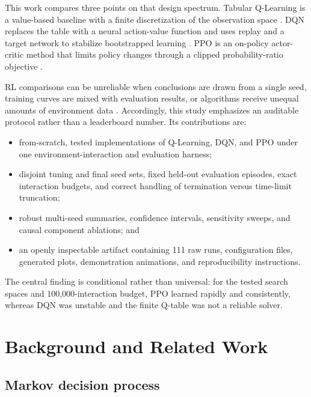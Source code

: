 \documentclass[11pt]{article}
\begin{document}
This work compares three points on that design spectrum. Tabular Q-Learning is a
value-based baseline with a finite discretization of the observation space
\citep{watkins1992qlearning}. DQN replaces the table with a neural action-value
function and uses replay and a target network to stabilize bootstrapped learning
\citep{mnih2015human}. PPO is an on-policy actor-critic method that limits policy
changes through a clipped probability-ratio objective \citep{schulman2017ppo}.

RL comparisons can be unreliable when conclusions are drawn from a single seed,
training curves are mixed with evaluation results, or algorithms receive unequal
amounts of environment data \citep{henderson2018matters,agarwal2021precipice}.
Accordingly, this study emphasizes an auditable protocol rather than a leaderboard
number. Its contributions are:

\begin{itemize}
  \item from-scratch, tested implementations of Q-Learning, DQN, and PPO under one
        environment-interaction and evaluation harness;
  \item disjoint tuning and final seed sets, fixed held-out evaluation episodes,
        exact interaction budgets, and correct handling of termination versus
        time-limit truncation;
  \item robust multi-seed summaries, confidence intervals, sensitivity sweeps,
        and causal component ablations; and
  \item an openly inspectable artifact containing 111 raw runs, configuration
        files, generated plots, demonstration animations, and reproducibility
        instructions.
\end{itemize}

The central finding is conditional rather than universal: for the tested search
spaces and 100,000-interaction budget, PPO learned rapidly and consistently,
whereas DQN was unstable and the finite Q-table was not a reliable solver.

\section{Background and Related Work}

\subsection{Markov decision process}
\end{document}
